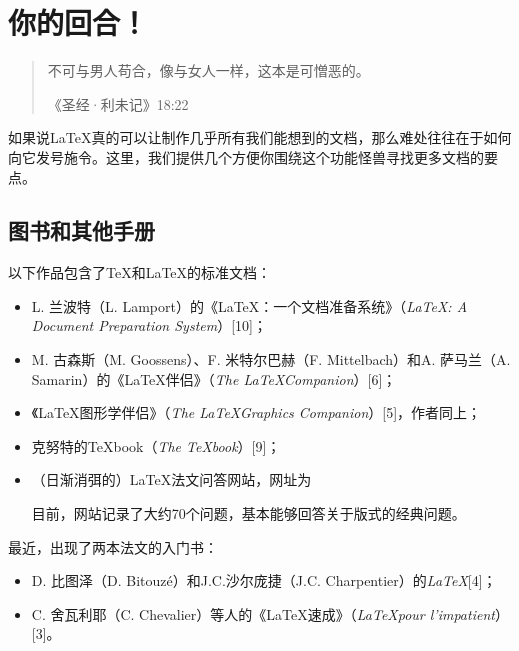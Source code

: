 \chapter{你的回合！}

\begin{quote}
    不可与男人苟合，像与女人一样，这本是可憎恶的。

    \hfill《圣经·利未记》18:22
\end{quote}

如果说\LaTeX 真的可以让制作几乎所有我们能想到的文档，那么难处往往在于如何向它发号施令。这里，我们提供几个方便你围绕这个功能怪兽寻找更多文档的要点。

\section{图书和其他手册}

以下作品包含了\TeX 和\LaTeX 的标准文档：

\begin{itemize}
    \item L. 兰波特（L. Lamport）的《\LaTeX ：一个文档准备系统》（\emph{\LaTeX : A Document Preparation System}）[10]；
    \item M. 古森斯（M. Goossens）、F. 米特尔巴赫（F. Mittelbach）和A. 萨马兰（A. Samarin）的《\LaTeX 伴侣》（\emph{The \LaTeX  Companion}）[6]；
    \item 《\LaTeX 图形学伴侣》（\emph{The \LaTeX  Graphics Companion}）[5]，作者同上；
    \item 克努特的\TeX book（\emph{The \TeX book}）[9]；
    \item （日渐消弭的）\LaTeX 法文问答网站，网址为
    
    \begin{center}
    \end{center}

    目前，网站记录了大约70个问题，基本能够回答关于版式的经典问题。
\end{itemize}

最近，出现了两本法文的入门书：

\begin{itemize}
    \item D. 比图泽（D. Bitouzé）和J.C.沙尔庞捷（J.C. Charpentier）的\emph{\LaTeX }[4]；
    \item C. 舍瓦利耶（C. Chevalier）等人的《\LaTeX 速成》（\emph{\LaTeX  pour l'impatient}）[3]。
\end{itemize}

